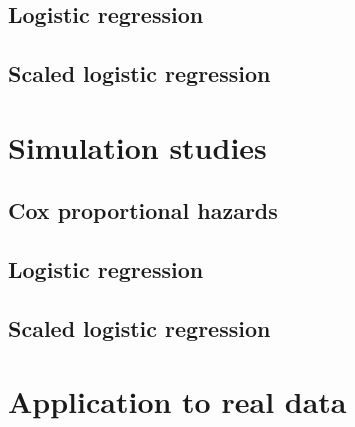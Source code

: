 \documentclass[12pt]{article}
\begin{document}
\subsection{Logistic regression}



\subsection{Scaled logistic regression}



\section{Simulation studies}



\subsection{Cox proportional hazards}



\subsection{Logistic regression}



\subsection{Scaled logistic regression}



\section{Application to real data}


\end{document}
